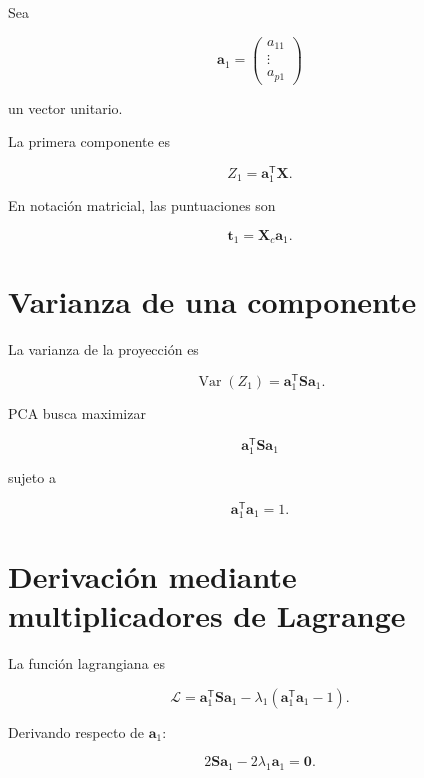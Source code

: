 \documentclass[
  spanish,
  10.5pt,
  letterpaper,
  DIV=11,
  numbers=noendperiod,
  oneside,
  open=any]{scrreprt}
\theoremstyle{definition}
\theoremstyle{definition}
\theoremstyle{plain}
\theoremstyle{remark}
\begin{document}

Sea

\[
\mathbf{a}_1
=
\begin{pmatrix}
a_{11}\\
\vdots\\
a_{p1}
\end{pmatrix}
\]

un vector unitario.

La primera componente es

\[
Z_1
=
\mathbf{a}_1^{\mathsf T}\mathbf{X}.
\]

En notación matricial, las puntuaciones son

\[
\mathbf{t}_1
=
\mathbf{X}_c\mathbf{a}_1.
\]

\section*{Varianza de una componente}\label{varianza-de-una-componente}


La varianza de la proyección es

\[
\operatorname{Var}(Z_1)
=
\mathbf{a}_1^{\mathsf T}
\mathbf{S}
\mathbf{a}_1.
\]

PCA busca maximizar

\[
\mathbf{a}_1^{\mathsf T}
\mathbf{S}
\mathbf{a}_1
\]

sujeto a

\[
\mathbf{a}_1^{\mathsf T}\mathbf{a}_1=1.
\]

\section*{Derivación mediante multiplicadores de
Lagrange}\label{derivaciuxf3n-mediante-multiplicadores-de-lagrange}


La función lagrangiana es

\[
\mathcal{L}
=
\mathbf{a}_1^{\mathsf T}
\mathbf{S}
\mathbf{a}_1
-
\lambda_1
\left(
\mathbf{a}_1^{\mathsf T}\mathbf{a}_1-1
\right).
\]

Derivando respecto de \(\mathbf{a}_1\):

\[
2\mathbf{S}\mathbf{a}_1
-
2\lambda_1\mathbf{a}_1
=
\mathbf{0}.
\]
\end{document}
